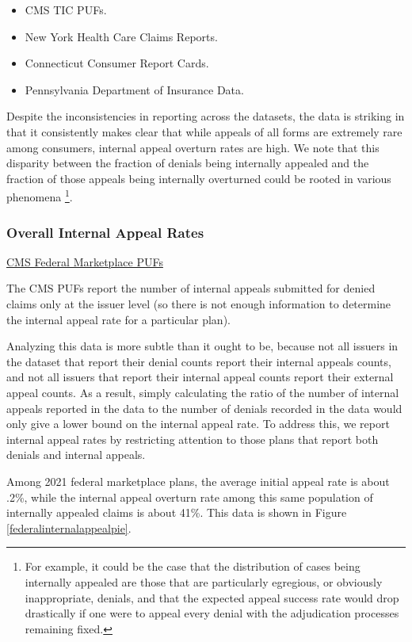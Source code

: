 \documentclass[12pt, a4paper,twoside]{report}
\theoremstyle{plain} %
\theoremstyle{definition} %
\theoremstyle{remark} %
\numberwithin{equation}{chapter}
\begin{document}
		\begin{itemize}
			\item CMS TIC PUFs.
			\item New York Health Care Claims Reports.
			\item Connecticut Consumer Report Cards.
			\item Pennsylvania Department of Insurance Data.
		\end{itemize}
	
		Despite the inconsistencies in reporting across the datasets, the data is striking in that it consistently makes clear that while appeals of all forms are extremely rare among consumers, internal appeal overturn rates are high. We note that this disparity between the fraction of denials being internally appealed and the fraction of those appeals being internally overturned could be rooted in various phenomena \footnote{For example, it could be the case that the distribution of cases being internally appealed are those that are particularly egregious, or obviously inappropriate, denials, and that the expected appeal success rate would drop drastically if one were to appeal every denial with the adjudication processes remaining fixed. }.
		
		
		\subsubsection{Overall Internal Appeal Rates}
		
		\underline{CMS Federal Marketplace PUFs}
		
		The CMS PUFs report the number of internal appeals submitted for denied claims only at the issuer level (so there is not enough information to determine the internal appeal rate for a particular plan).
		
		Analyzing this data is more subtle than it ought to be, because not all issuers in the dataset that report their denial counts report their internal appeals counts, and not all issuers that report their internal appeal counts report their external appeal counts. As a result, simply calculating the ratio of the number of internal appeals reported in the data to the number of denials recorded in the data would only give a lower bound on the internal appeal rate. To address this, we report internal appeal rates by restricting attention to those plans that report both denials and internal appeals.
		
		Among 2021 federal marketplace plans, the average initial appeal rate is about .2\%, while the internal appeal overturn rate among this same population of internally appealed claims is about 41\%. This data is shown in Figure \ref{federalinternalappealpie}.
		
\end{document}
